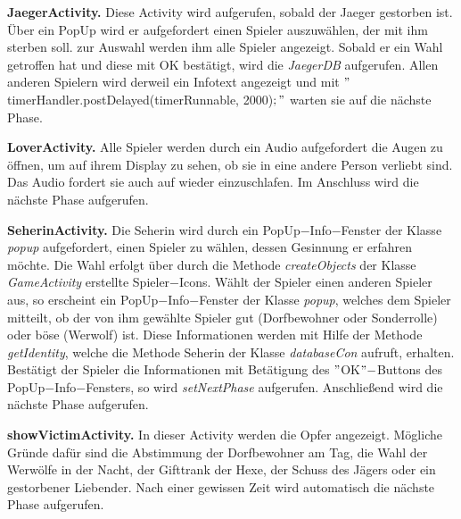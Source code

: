 \documentclass[12pt]{article}
\begin{document}
\vspace{0,3 cm}      
      
\textbf{JaegerActivity.}
Diese Activity wird aufgerufen, sobald der Jaeger gestorben ist. Über ein PopUp wird er aufgefordert einen Spieler auszuwählen, der mit ihm sterben soll. zur Auswahl werden ihm alle Spieler angezeigt. Sobald er ein Wahl getroffen hat und diese mit OK bestätigt, wird die \textit{JaegerDB} aufgerufen.
Allen anderen Spielern wird derweil ein Infotext angezeigt und mit $"$timerHandler.postDelayed(timerRunnable, 2000)$;"$ warten sie auf die nächste Phase.
    
\vspace{0,3 cm}    
      
\textbf{LoverActivity.}
Alle Spieler werden durch ein Audio aufgefordert die Augen zu öffnen, um auf ihrem Display zu sehen, ob sie in eine andere Person verliebt sind. Das Audio fordert sie auch auf wieder einzuschlafen. Im Anschluss wird die nächste Phase aufgerufen.

\vspace{0,3 cm}

\textbf{SeherinActivity.}
Die Seherin wird durch ein PopUp$-$Info$-$Fenster der Klasse \textit{popup} aufgefordert, einen Spieler zu wählen, dessen Gesinnung er erfahren möchte. Die Wahl erfolgt über durch die Methode \textit{createObjects} der Klasse \textit{GameActivity} erstellte Spieler$-$Icons. Wählt der Spieler einen anderen Spieler aus, so erscheint ein PopUp$-$Info$-$Fenster der Klasse \textit{popup}, welches dem Spieler mitteilt, ob der von ihm gewählte Spieler gut (Dorfbewohner oder Sonderrolle) oder böse (Werwolf) ist. Diese Informationen werden mit Hilfe der Methode \textit{getIdentity}, welche die Methode Seherin der Klasse \textit{databaseCon} aufruft, erhalten. Bestätigt der Spieler die Informationen mit Betätigung des $"$OK$"-$Buttons des  PopUp$-$Info$-$Fensters, so wird \textit{setNextPhase} aufgerufen. Anschließend wird die nächste Phase aufgerufen.

\vspace{0,3 cm}      
   
\textbf{showVictimActivity.}
In dieser Activity werden die Opfer angezeigt.
Mögliche Gründe dafür sind die Abstimmung der Dorfbewohner am Tag, die Wahl der Werwölfe in der
Nacht, der Gifttrank der Hexe, der Schuss des Jägers oder ein gestorbener Liebender.
Nach einer gewissen Zeit wird automatisch die nächste Phase aufgerufen.

\vspace{0,3 cm}      
      
\end{document}
